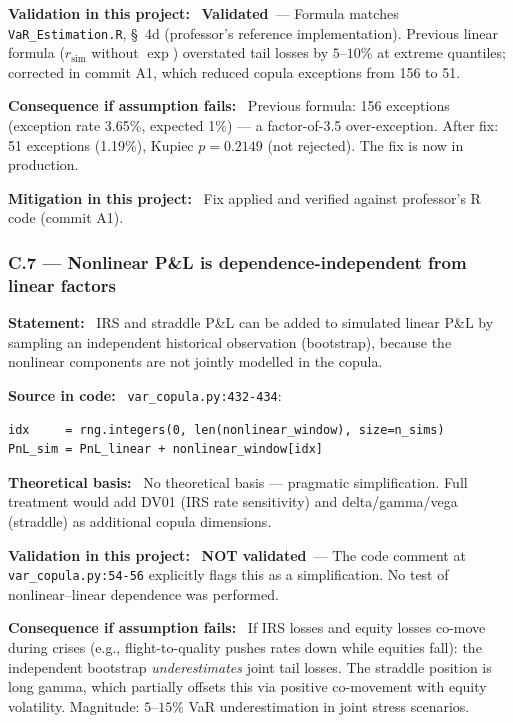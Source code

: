 \documentclass[11pt,a4paper]{article}
\newcommand{\asmfield}[1]{\medskip\noindent\textbf{#1:}\ }
\newcommand{\code}[1]{\texttt{#1}}
\newcommand{\validated}{\textbf{Validated}}
\newcommand{\notvalidated}{\textbf{NOT validated}}
\begin{document}
\asmfield{Validation in this project}
\validated\ --- Formula matches \code{VaR\_Estimation.R}, \S~4d (professor's
reference implementation). Previous linear formula ($r_{\text{sim}}$ without
$\exp$) overstated tail losses by $5$--$10\%$ at extreme quantiles;
corrected in commit A1, which reduced copula exceptions from 156 to 51.

\asmfield{Consequence if assumption fails}
Previous formula: 156 exceptions (exception rate 3.65\%, expected 1\%) ---
a factor-of-3.5 over-exception. After fix: 51 exceptions (1.19\%), Kupiec
$p = 0.2149$ (not rejected). The fix is now in production.

\asmfield{Mitigation in this project}
Fix applied and verified against professor's R code (commit A1).

\subsubsection{C.7 --- Nonlinear P\&L is dependence-independent from linear factors}\label{asm:C7}

\asmfield{Statement}
IRS and straddle P\&L can be added to simulated linear P\&L by sampling
an independent historical observation (bootstrap), because the nonlinear
components are not jointly modelled in the copula.

\asmfield{Source in code}
\code{var\_copula.py:432-434}:
\begin{lstlisting}
idx     = rng.integers(0, len(nonlinear_window), size=n_sims)
PnL_sim = PnL_linear + nonlinear_window[idx]
\end{lstlisting}

\asmfield{Theoretical basis}
No theoretical basis --- pragmatic simplification. Full treatment would
add DV01 (IRS rate sensitivity) and delta/gamma/vega (straddle) as
additional copula dimensions.

\asmfield{Validation in this project}
\notvalidated\ --- The code comment at \code{var\_copula.py:54-56} explicitly
flags this as a simplification. No test of nonlinear--linear dependence
was performed.

\asmfield{Consequence if assumption fails}
If IRS losses and equity losses co-move during crises (e.g., flight-to-quality
pushes rates down while equities fall): the independent bootstrap
\emph{underestimates} joint tail losses. The straddle position is long
gamma, which partially offsets this via positive co-movement with equity
volatility. Magnitude: $5$--$15\%$ VaR underestimation in joint stress scenarios.
\end{document}
